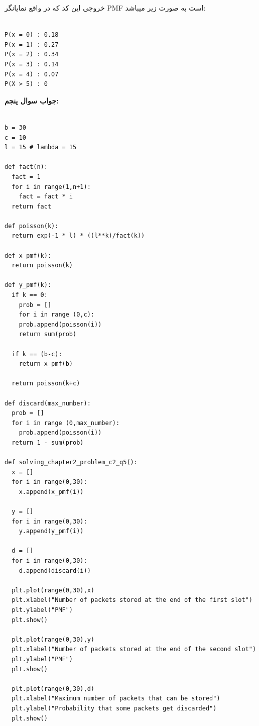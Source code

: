 \documentclass[a4paper,14pt]{article}
\begin{document}
	خروجی این کد که در واقع نمایانگر PMF است به صورت زیر میباشد:
	

	\fontsize{11}{11}\selectfont
\begin{latin}
	\begin{lstlisting}
	
P(x = 0) : 0.18
P(x = 1) : 0.27
P(x = 2) : 0.34
P(x = 3) : 0.14
P(x = 4) : 0.07
P(X > 5) : 0

	\end{lstlisting}
\end{latin}
\fontsize{14}{14}\selectfont
	

\textbf{جواب سوال پنجم:}\\

\fontsize{11}{11}\selectfont
\begin{latin}
	\begin{lstlisting}

b = 30
c = 10
l = 15 # lambda = 15

def fact(n):
  fact = 1
  for i in range(1,n+1):
    fact = fact * i
  return fact

def poisson(k):
  return exp(-1 * l) * ((l**k)/fact(k))

def x_pmf(k):
  return poisson(k)

def y_pmf(k):
  if k == 0:
    prob = []
    for i in range (0,c):
    prob.append(poisson(i))
    return sum(prob)

  if k == (b-c):
    return x_pmf(b)  
 
  return poisson(k+c)

def discard(max_number):
  prob = []
  for i in range (0,max_number):
    prob.append(poisson(i))
  return 1 - sum(prob)

def solving_chapter2_problem_c2_q5():
  x = []
  for i in range(0,30):
    x.append(x_pmf(i))

  y = []
  for i in range(0,30):
    y.append(y_pmf(i))

  d = []
  for i in range(0,30):
    d.append(discard(i))

  plt.plot(range(0,30),x)
  plt.xlabel("Number of packets stored at the end of the first slot")
  plt.ylabel("PMF")
  plt.show()

  plt.plot(range(0,30),y)
  plt.xlabel("Number of packets stored at the end of the second slot")
  plt.ylabel("PMF")
  plt.show()

  plt.plot(range(0,30),d)
  plt.xlabel("Maximum number of packets that can be stored")
  plt.ylabel("Probability that some packets get discarded")
  plt.show()

	\end{lstlisting}
\end{latin}
\fontsize{14}{14}\selectfont
\end{document}
